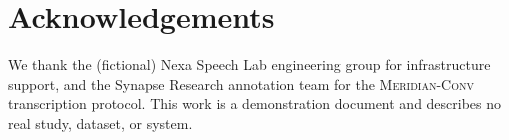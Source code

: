 \section*{Acknowledgements}
{\footnotesize\color{isgray}
We thank the (fictional) Nexa Speech Lab engineering group for infrastructure support, and the Synapse
Research annotation team for the \textsc{Meridian-Conv} transcription protocol. This work is a
demonstration document and describes no real study, dataset, or system.}



